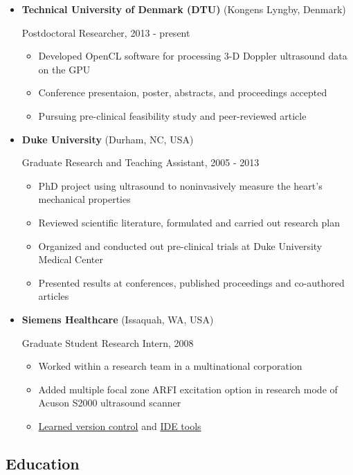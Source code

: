 \documentclass[]{article}
\begin{document}
\begin{itemize}
\item
  \textbf{Technical University of Denmark (DTU)} (Kongens Lyngby,
  Denmark)

  Postdoctoral Researcher, 2013 - present

  \begin{itemize}
  \item
    Developed OpenCL software for processing 3-D Doppler ultrasound data
    on the GPU
  \item
    Conference presentaion, poster, abstracts, and proceedings accepted
  \item
    Pursuing pre-clinical feasibility study and peer-reviewed article
  \end{itemize}
\item
  \textbf{Duke University} (Durham, NC, USA)

  Graduate Research and Teaching Assistant, 2005 - 2013

  \begin{itemize}
  \item
    PhD project using ultrasound to noninvasively measure the heart's
    mechanical properties
  \item
    Reviewed scientific literature, formulated and carried out research
    plan
  \item
    Organized and conducted out pre-clinical trials at Duke University
    Medical Center
  \item
    Presented results at conferences, published proceedings and
    co-authored articles
  \end{itemize}
\item
  \textbf{Siemens Healthcare} (Issaquah, WA, USA)

  Graduate Student Research Intern, 2008

  \begin{itemize}
  \item
    Worked within a research team in a multinational corporation
  \item
    Added multiple focal zone ARFI excitation option in research mode of
    Acuson S2000 ultrasound scanner
  \item
    \href{http://www-03.ibm.com/software/products/en/clearcase}{Learned
    version control} and \href{http://www.visualstudio.com/}{IDE tools}
  \end{itemize}
\end{itemize}
\subsection{Education}
\end{document}
